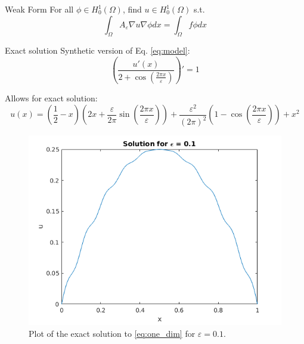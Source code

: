 \documentclass{beamer}
\renewcommand{\epsilon}{\varepsilon}
\begin{document}
\begin{frame}[t]{Weak Form}
    For all $\phi \in H^1_0(\Omega)$, find $u \in H^1_0(\Omega)$ s.t.
    \begin{equation}
        \int_\Omega A_\epsilon\nabla u\nabla\phi dx= \int_\Omega f\phi dx
        \label{eq:weak_form}
    \end{equation}
\end{frame}

\begin{frame}[t]{Exact solution}
  Synthetic version of Eq. \eqref{eq:model}:
  \begin{equation}
    \left( \frac{u'(x)}{2+\cos \left( \frac{2\pi x}{\epsilon} \right)} \right)' = 1
    \label{eq:one_dim}
  \end{equation}

  Allows for exact solution:
  \begin{equation}
    u(x) = \left( \frac{1}{2} - x \right) \left(2x + \frac{\epsilon}{2\pi}\sin\left(\frac{2\pi x}{\epsilon}\right) \right) + \frac{\epsilon^{2}}{(2\pi)^{2}}\left( 1 - \cos \left( \frac{2 \pi x}{\epsilon} \right) \right) + x^{2}
   \label{eq:one_dim_sol}
 \end{equation}
 \begin{figure}[th]
    \centering
    \includegraphics[width=0.35\linewidth]{one_dim_exact.png}
    \caption{Plot of the exact solution to \eqref{eq:one_dim} for $\epsilon=0.1 $.}
    \label{fig:one_dim_exact}
\end{figure}
\end{frame}
\end{document}
